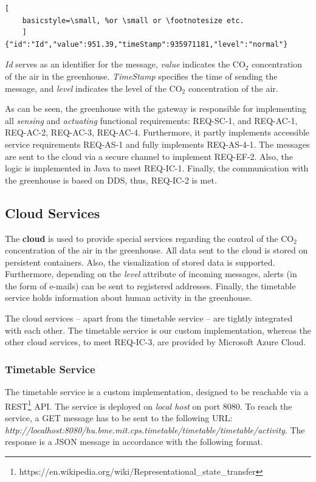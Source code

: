 \documentclass[a4paper, 11pt]{article}
\begin{document}
	\begin{lstlisting}[
	basicstyle=\small, %or \small or \footnotesize etc.
	]
{"id":"Id","value":951.39,"timeStamp":935971181,"level":"normal"}
	\end{lstlisting}
	
	\textsl{Id} serves as an identifier for the message, \textsl{value} indicates the CO$_2$ concentration of the air in the greenhouse. \textsl{TimeStamp} specifies the time of sending the message, and \textsl{level} indicates the level of the CO$_2$ concentration of the air. 
		
	As can be seen, the greenhouse with the gateway is responsible for implementing all \textsl{sensing} and \textsl{actuating} functional requirements: REQ-SC-1, and REQ-AC-1, REQ-AC-2, REQ-AC-3, REQ-AC-4. Furthermore, it partly implements accessible service requirements REQ-AS-1 and fully implements REQ-AS-4-1. The messages are sent to the cloud via a secure channel to implement REQ-EF-2. Also, the logic is implemented in Java to meet REQ-IC-1. Finally, the communication with the greenhouse is based on DDS, thus, REQ-IC-2 is met.
	
	\subsection{Cloud Services}
	\label{sec:cloud-services}
	The \textbf{cloud} is used to provide special services regarding the control of the CO$_2$ concentration of the air in the greenhouse. All data sent to the cloud is stored on persistent containers. Also, the visualization of stored data is supported. Furthermore, depending on the \textsl{level} attribute of incoming messages, alerts (in the form of e-mails) can be sent to registered addresses. Finally, the timetable service holds information about human activity in the greenhouse.
	
	The cloud services -- apart from the timetable service -- are tightly integrated with each other. The timetable service is our custom implementation, whereas the other cloud services, to meet REQ-IC-3, are provided by Microsoft Azure Cloud.
	
	\subsubsection{Timetable Service}
	The timetable service is a custom implementation, designed to be reachable via a REST\footnote{https://en.wikipedia.org/wiki/Representational\_state\_transfer} API. The service is deployed on \emph{local host} on port 8080. To reach the service, a GET message has to be sent to the following URL: \textsl{http://localhost:8080/hu.bme.mit.cps.timetable/timetable/timetable/activity}. The response is a JSON message in accordance with the following format.
\end{document}

